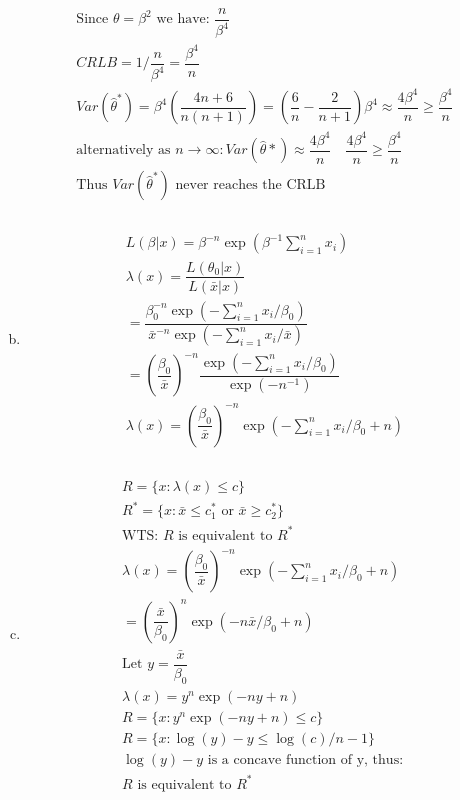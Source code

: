 \documentclass{article}
\newcommand{\B}{\beta}
\newcommand{\hth}{\hat{\theta}}
\newcommand{\sumx}{\sum_{i=1}^{n}x_i}
\newcommand{\ta}{\theta}
\begin{document}
\begin{flushleft}
\begin{enumerate}[(a)]
\begin{multline*}
\text{Since } \ta=\B^2 \text{ we have: }\dfrac{n}{\B^4}\\
CRLB=1/\dfrac{n}{\B^4}=\dfrac{\B^4}{n}\\
Var(\hth^*)=\B^4\left(\dfrac{4n+6}{n(n+1)}\right)=\left(\dfrac{6}{n}-\dfrac{2}{n+1}\right)\B^4\approx \dfrac{4\B^4}{n}\geq \dfrac{\B^4}{n}\\
\text{alternatively as } n\to\infty: Var(\hth*)\approx \dfrac{4\B^4}{n}\quad \dfrac{4\B^4}{n}\geq \dfrac{\B^4}{n}\\
\text{Thus } Var(\hth^*) \text{ never reaches the CRLB}\\
\end{multline*}

	\item 
\begin{multline*}\\
L(\B|x)=\B^{-n}\exp\left(\B^{-1}\sumx\right)\\
\lambda(x)=\dfrac{L(\theta_0|x)}{L(\bar{x}|x)}\\
=\dfrac{\B_0^{-n}\exp\left(-\sumx/\B_0\right)}{\bar{x}^{-n}\exp\left(-\sumx/\bar{x} \right)}\\
=\left(\dfrac{\B_0}{\bar{x}}\right)^{-n}\dfrac{\exp\left(-\sumx/\B_0 \right)}{\exp\left(-n^{-1}\right)}\\
\lambda(x)=\left(\dfrac{\B_0}{\bar{x}}\right)^{-n}\exp\left(-\sumx/\B_0+n\right)\\
\end{multline*}

	\item 
\begin{multline*}\\
R=\{x:\lambda(x)\leq c\}\\
R^*=\{x:\bar{x}\leq c_1^* \text{ or } \bar{x}\geq c_2^* \}\\
\text{WTS: } R \text{ is equivalent to } R^*\\
\lambda(x)=\left(\dfrac{\B_0}{\bar{x}}\right)^{-n}\exp\left(-\sumx/\B_0+n\right)\\
=\left(\dfrac{\bar{x}}{\B_0}\right)^{n}\exp\left(-n\bar{x}/\B_0+n\right)\\
\text{Let } y=\dfrac{\bar{x}}{\B_0}\\
\lambda(x)=y^{n}\exp(-ny+n)\\
R=\{x:y^{n}\exp(-ny+n)\leq c\}\\
R=\{x:\log(y)-y\leq \log(c)/n-1\}\\
\log(y)-y \text{ is a concave function of y, thus: }\\
R \text{ is equivalent to } R^*\\
\end{multline*}

\end{enumerate}

\end{flushleft}
\end{document}
